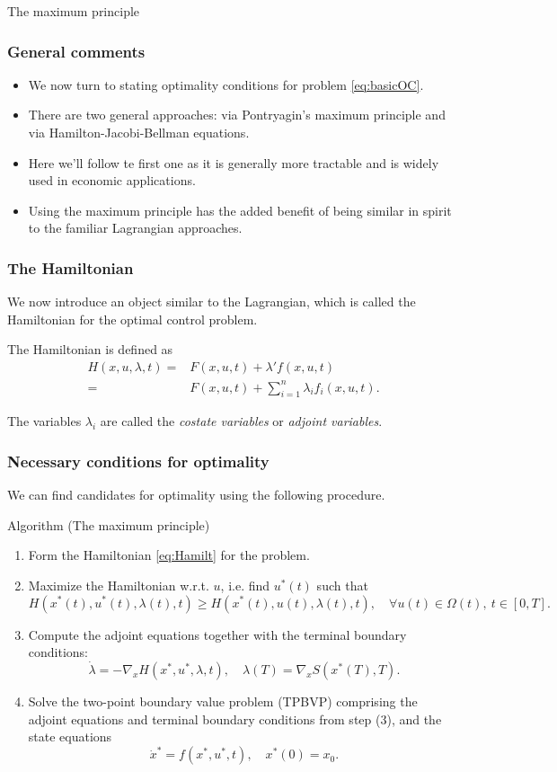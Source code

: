 \documentclass[10pt]{beamer}
\theoremstyle{definition}
\begin{document}
\begin{section}{The maximum principle}\label{sec:max}

\begin{frame}[fragile]
\frametitle{General comments}
\begin{itemize}\itemsep1em
\item We now turn to stating optimality conditions for problem \eqref{eq:basicOC}.
\item There are two general approaches: via Pontryagin's maximum principle and via Hamilton-Jacobi-Bellman equations.
\item Here we'll follow te first one as it is generally more tractable and is widely used in economic applications.
\item Using the maximum principle has the added benefit of being similar in spirit to the familiar Lagrangian approaches. 
\end{itemize}
\end{frame}

\begin{frame}[fragile]
\frametitle{The Hamiltonian}

We now introduce an object similar to the Lagrangian, which is called the Hamiltonian for the optimal control problem.\bigskip

The Hamiltonian is defined as
\begin{equation}
\begin{split}
H(x,u,\lambda,t) =& F(x,u,t)+\lambda' f(x,u,t) \\
=&  F(x,u,t)+\sum_{i=1}^{n}\lambda_i f_i(x,u,t).
\end{split}
\label{eq:Hamilt}
\end{equation}\bigskip

The variables $ \lambda_i $ are called the \emph{costate variables} or \emph{adjoint variables}.
\end{frame}

\begin{frame}[fragile]
\frametitle{Necessary conditions for optimality}
We can find candidates for optimality using the following procedure.

\begin{block}{Algorithm (The maximum principle)}
\begin{enumerate}
\item Form the Hamiltonian \eqref{eq:Hamilt} for the problem.
\item Maximize the Hamiltonian w.r.t. $ u $, i.e. find $ u^*(t) $ such that
\[ H(x^*(t),u^*(t),\lambda(t),t)\geq  H(x^*(t),u(t),\lambda(t),t),\quad \forall u(t)\in \Omega(t),~t \in[0,T]. \]
\item Compute the adjoint equations together with the terminal boundary conditions:
\[ \dot{\lambda} = -\nabla_x H(x^*,u^*,\lambda,t),\quad \lambda(T)=\nabla_x S(x^*(T),T).  \]
\item Solve the two-point boundary value problem (TPBVP) comprising the adjoint equations and terminal boundary conditions from step (3), and the state equations \[ \dot{x}^* = f(x^*,u^*,t), \quad x^*(0)=x_0. \]
\end{enumerate}
\end{block}
\end{frame}


\end{section}
\end{document}
